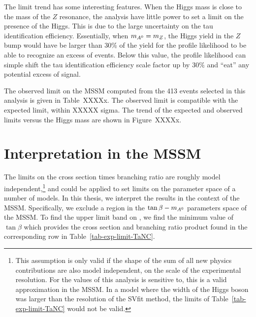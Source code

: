 The limit trend has
some interesting features.   When the Higgs mass is close to the mass of the $Z$
resonance, the analysis have little power to set a limit on the presence of the
Higgs.  This is due to the large uncertainty on the tau identification
efficiency.  Essentially, when \mbox{$m_{A^0} = m_Z$}, the Higgs yield in the $Z$
bump would have be larger than 30\% of the \ZTT yield for the profile likelihood
to be able to recognize an excess of events. Below this value, the profile
likelihood can simple shift the tau identification efficiency scale factor up by
30\% and ``eat'' any potential excess of signal.

The observed limit on the MSSM computed from the 413 events selected in this
analysis is given in Table~XXXXx.  The observed limit is compatible with the
expected limit, within XXXXX sigma.  The trend of the expected and observed
limits versus the Higgs mass are shown in Figure~XXXXx.  

\section{Interpretation in the MSSM}
\label{sec:MSSMInterp}
%
The limits on the cross section times branching ratio are roughly model
independent,\footnote{This assumption is only valid if the shape of the sum of
all new physics contributions are also model independent, on the scale of the
experimental resolution.  For the values of \tb this analysis is sensitive to,
this is a valid approximation in the MSSM\@.  In a model where the width of the
Higgs boson was larger than the resolution of the SVfit method, the limits of
Table~\ref{tab-exp-limit-TaNC} would not be valid.} and could be applied to set
limits on the parameter space of a number of models.  In this thesis, we
interpret the results in the context of the MSSM\@.  Specifically, we exclude a
region in the $\mbox{\ensuremath{\tan\beta}} - m_{A^0}$ parameters space of the MSSM\@.  To find the upper
limit band on \tb, we find the minimum value of $\tan\beta$ which provides the
cross section and branching ratio product found in the corresponding row in
Table~\ref{tab-exp-limit-TaNC}. 

